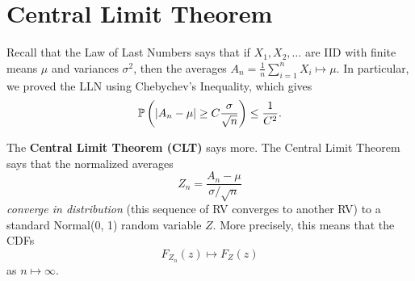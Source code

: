 \section{Central Limit Theorem}
Recall that the Law of Last Numbers says that if $X_1, X_2, \dots$ are IID with finite means $\mu$ and variances $\sigma^2$, then the averages $A_n = \frac{1}{n} \sum_{i = 1}^{n} X_i \mapsto \mu$. In particular, we proved the LLN using Chebychev's Inequality, which gives 
\[\mathbb{P}\left(|A_n - \mu| \geq C \frac{\sigma}{\sqrt{n}}\right) \leq \frac{1}{C^2}.\] 

The \textbf{Central Limit Theorem (CLT)} says more. The Central Limit Theorem says that the normalized averages \[Z_n = \frac{A_n - \mu}{\sigma / \sqrt{n}}\] \emph{converge in distribution} (this sequence of RV converges to another RV) to a standard Normal(0, 1) random variable $Z$. More precisely, this means that the CDFs \[F_{Z_n}(z) \mapsto F_{Z}(z)\] as $n \mapsto \infty$. 

